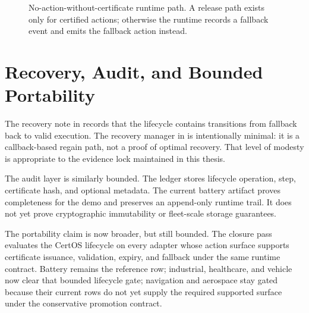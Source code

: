 \begin{figure}[ht]
\centering
{}
\caption{No-action-without-certificate runtime path.  A release path exists
only for certified actions; otherwise the runtime records a fallback event
and emits the fallback action instead.}
\label{fig:certos-runtime-path}
\end{figure}

\section{Recovery, Audit, and Bounded Portability}

The recovery note in  records that
the lifecycle contains transitions from fallback back to valid execution.
The recovery manager in  is intentionally minimal:
it is a callback-based regain path, not a proof of optimal recovery.  That
level of modesty is appropriate to the evidence lock maintained in this thesis.

The audit layer is similarly bounded.  The ledger stores lifecycle
operation, step, certificate hash, and optional metadata.  The current
battery artifact proves completeness for the demo and preserves an
append-only runtime trail.  It does not yet prove cryptographic immutability
or fleet-scale storage guarantees.

The portability claim is now broader, but still bounded.  The closure pass
evaluates the CertOS lifecycle on every adapter whose action surface supports
certificate issuance, validation, expiry, and fallback under the same runtime
contract.  Battery remains the reference row; industrial, healthcare, and
vehicle now clear that bounded lifecycle gate; navigation and aerospace stay
gated because their current rows do not yet supply the required supported
surface under the conservative promotion contract.

